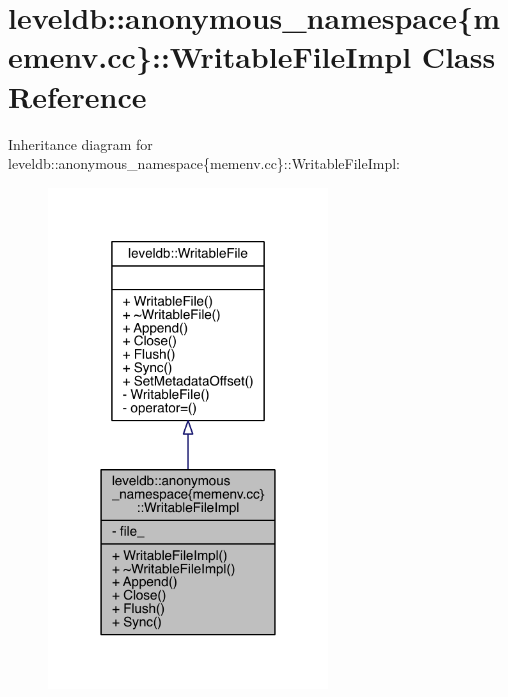 \hypertarget{classleveldb_1_1anonymous__namespace_02memenv_8cc_03_1_1_writable_file_impl}{}\section{leveldb\+:\+:anonymous\+\_\+namespace\{memenv.\+cc\}\+:\+:Writable\+File\+Impl Class Reference}
\label{classleveldb_1_1anonymous__namespace_02memenv_8cc_03_1_1_writable_file_impl}


Inheritance diagram for leveldb\+:\+:anonymous\+\_\+namespace\{memenv.\+cc\}\+:\+:Writable\+File\+Impl\+:
\nopagebreak
\begin{figure}[H]
\begin{center}
\leavevmode
\includegraphics[width=210pt]{classleveldb_1_1anonymous__namespace_02memenv_8cc_03_1_1_writable_file_impl__inherit__graph}
\end{center}
\end{figure}


